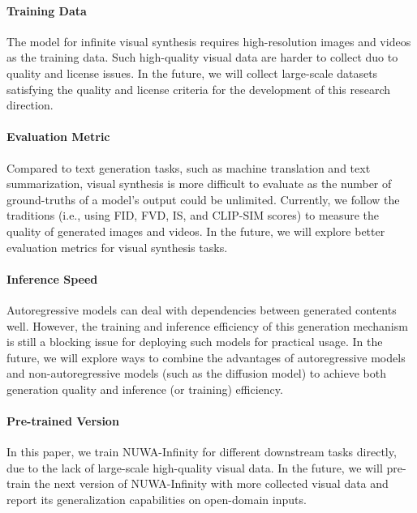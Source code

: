 \documentclass{article}
\begin{document}
\paragraph{Training Data}
The model for infinite visual synthesis requires high-resolution images and videos as the training data. Such high-quality visual data are harder to collect duo to quality and license issues. In the future, we will collect large-scale datasets satisfying the quality and license criteria for the development of this research direction.

\paragraph{Evaluation Metric}
Compared to text generation tasks, such as machine translation and text summarization, visual synthesis is more difficult to evaluate as the number of ground-truths of a model's output could be unlimited. Currently, we follow the traditions (i.e., using FID, FVD, IS, and CLIP-SIM scores) to measure the quality of generated images and videos. In the future, we will explore better evaluation metrics for visual synthesis tasks.

\paragraph{Inference Speed} Autoregressive models can deal with dependencies between generated contents well. However, the training and inference efficiency of this generation mechanism is still a blocking issue for deploying such models for practical usage. In the future, we will explore ways to combine the advantages of autoregressive models and non-autoregressive models (such as the diffusion model) to achieve both generation quality and inference (or training) efficiency.

\paragraph{Pre-trained Version} In this paper, we train NUWA-Infinity for different downstream tasks directly, due to the lack of large-scale high-quality visual data. In the future, we will pre-train the next version of NUWA-Infinity with more collected visual data and report its generalization  capabilities on open-domain inputs. 
\end{document}
